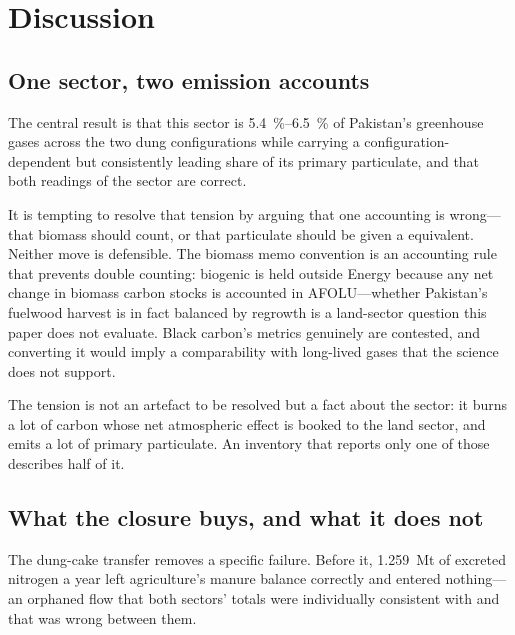 \section{Discussion}
\label{sec:discussion}

\subsection{One sector, two emission accounts}

The central result is that this sector is \SIrange{5.4}{6.5}{\percent} of Pakistan's
greenhouse gases across the two dung configurations while carrying a configuration-
dependent but consistently leading share of its primary particulate, and that both
readings of the sector are correct.

It is tempting to resolve that tension by arguing that one accounting is wrong---that biomass
\COtwo{} should count, or that particulate should be given a \COe{} equivalent. Neither move is
defensible. The biomass memo convention is an accounting rule that prevents double
counting: biogenic \COtwo{} is held outside Energy because any net change in biomass carbon
stocks is accounted in AFOLU---whether Pakistan's fuelwood harvest is in fact balanced by
regrowth is a land-sector question this paper does not evaluate. Black carbon's metrics genuinely are contested, and converting it
would imply a comparability with long-lived gases that the science does not support.

The tension is not an artefact to be resolved but a fact about the sector: it burns a lot
of carbon whose net atmospheric effect is booked to the land sector, and emits a lot of
primary particulate. An inventory that reports only one of those describes half of it.

\subsection{What the closure buys, and what it does not}

The dung-cake transfer removes a specific failure. Before it, \SI{1.259}{\mega\tonne} of
excreted nitrogen a year left agriculture's manure balance correctly and entered nothing---an
orphaned flow that both sectors' totals were individually consistent with and that was wrong
between them.

